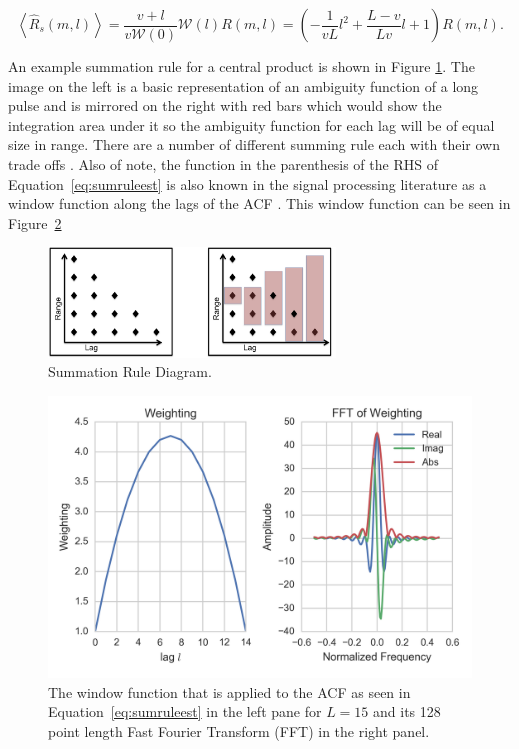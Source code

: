 \begin{equation}
\label{eq:sumruleest}
\left\langle\widehat{R}_s(m,l) \right\rangle  =\frac{v+l}{v\mathcal{W}(0)}\mathcal{W}(l)R(m,l) =\left(-\frac{1}{vL}l^2+\frac{L-v}{Lv}l+1\right)   R(m,l).
\end{equation}

An example summation rule for a central product is shown in Figure \ref{fig:sumrule}. The image on the left is a basic representation of an ambiguity function of a long pulse and is mirrored on the right with red bars which would show the integration area under it so the ambiguity function for each lag will be of equal size in range. There are a number of different summing rule each with their own trade offs \citep{nygren1996}. Also of note, the function in the parenthesis of the RHS of Equation~\ref{eq:sumruleest} is also known in the signal processing literature as a window function along the lags of the ACF \citep{dtsp:openhiem}. This window function can be seen in Figure~\ref{fig:isrwindow}

\begin{figure}[!t]
\centering
\includegraphics[width=3in]{sumrule}
\caption{Summation Rule Diagram.}
\label{fig:sumrule}
\end{figure}

\begin{figure}[!t]
\centering
\includegraphics[width=5in]{ISRWindow}
\caption{The window function that is applied to the ACF as seen in Equation~\ref{eq:sumruleest} in the left pane for $L=15$ and its 128 point length Fast Fourier Transform (FFT) in the right panel. }
\label{fig:isrwindow}
\end{figure}



